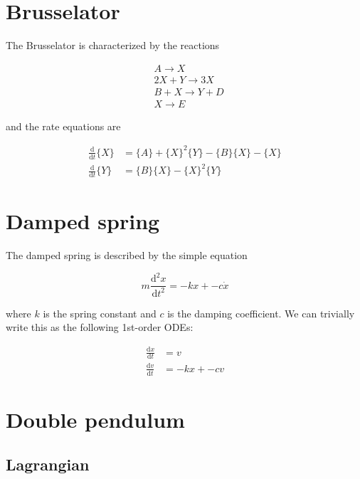 \documentclass{report}
\begin{document}
\tableofcontents

\chapter{Brusselator}

The Brusselator is characterized by the reactions

\begin{align}
  &A \rightarrow X \\
  &2X + Y \rightarrow 3X \\
  &B + X \rightarrow Y + D \\
  &X \rightarrow E
\end{align}

and the rate equations are

\begin{align}
  \frac{\mathrm{d}}{\mathrm{d}t} \{X\} &= \{A\} + \{X\}^2\{Y\} - \{B\}\{X\} - \{X\} \\
  \frac{\mathrm{d}}{\mathrm{d}t} \{Y\} &= \{B\}\{X\} - \{X\}^2\{Y\}
\end{align}


\chapter{Damped spring}

The damped spring is described by the simple equation

\begin{equation}
  m\frac{\mathrm{d}^2x}{\mathrm{d}t^2} = -kx + -c\dot{x}
\end{equation}

where $k$ is the spring constant and $c$ is the damping coefficient. We can trivially write this as the following 1st-order ODEs:

\begin{align}
  \frac{\mathrm{d}x}{\mathrm{d}t} &= v \\
  \frac{\mathrm{d}v}{\mathrm{d}t} &= -kx + -cv
\end{align}


\chapter{Double pendulum}

\section{Lagrangian}
\end{document}
